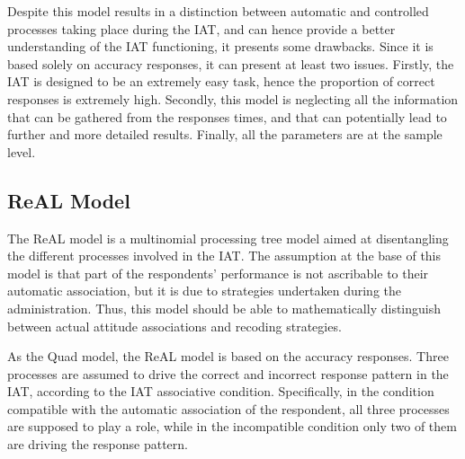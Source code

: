 \documentclass[12pt]{book}
\begin{document}
Despite this model results in a distinction between automatic and controlled processes taking place during the IAT, and can hence provide a better understanding of the IAT functioning, it presents some drawbacks. Since it is based solely on accuracy responses, it can present at least two issues. Firstly, the IAT is designed to be an extremely easy task, hence the proportion of correct responses is extremely high. Secondly, this model is neglecting all the information that can be gathered from the responses times, and that can potentially lead to further and more detailed results. Finally, all the parameters are at the sample level. 
 



\subsection{ReAL Model}\label{sub:real}

The ReAL model \cite{Meissner2013} is a multinomial processing tree model aimed at disentangling the different processes involved in the IAT. The assumption at the base of this model is that part of the respondents' performance is not ascribable to their automatic association, but it is due to strategies undertaken during the administration. Thus, this model should be able to mathematically distinguish between actual attitude associations and recoding strategies. 

As the Quad model, the ReAL model is based on the accuracy responses. Three processes are assumed to drive the correct and incorrect response pattern in the IAT, according to the IAT associative condition. Specifically, in the condition compatible with the automatic association of the respondent, all three processes are supposed to play a role, while in the incompatible condition only two of them are driving the response pattern. 
\end{document}

